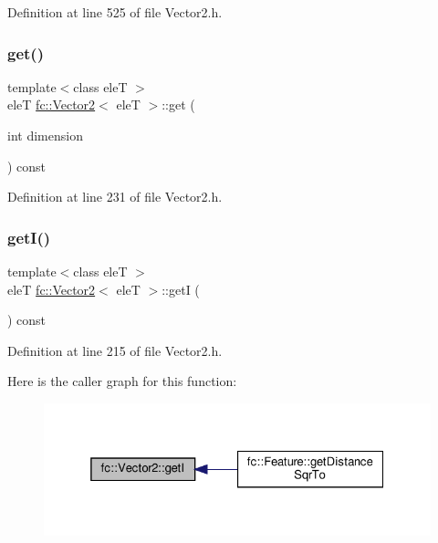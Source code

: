 Definition at line 525 of file Vector2.\+h.

\mbox{\label{classfc_1_1Vector2_acca96b9b6d26a214958f7e2d5fd63548}} 
\subsubsection{\texorpdfstring{get()}{get()}}
{\footnotesize\ttfamily template$<$class eleT $>$ \\
eleT \hyperlink{classfc_1_1Vector2}{fc\+::\+Vector2}$<$ eleT $>$\+::get (\begin{DoxyParamCaption}\item[{int}]{dimension }\end{DoxyParamCaption}) const}



Definition at line 231 of file Vector2.\+h.

\mbox{\label{classfc_1_1Vector2_a982222ce26bc27601de2ba42a3a48b80}} 
\subsubsection{\texorpdfstring{get\+I()}{getI()}}
{\footnotesize\ttfamily template$<$class eleT $>$ \\
eleT \hyperlink{classfc_1_1Vector2}{fc\+::\+Vector2}$<$ eleT $>$\+::getI (\begin{DoxyParamCaption}{ }\end{DoxyParamCaption}) const}



Definition at line 215 of file Vector2.\+h.

Here is the caller graph for this function\+:
\nopagebreak
\begin{figure}[H]
\begin{center}
\leavevmode
\includegraphics[width=325pt]{d9/d08/classfc_1_1Vector2_a982222ce26bc27601de2ba42a3a48b80_icgraph}
\end{center}
\end{figure}
\mbox{\label{classfc_1_1Vector2_a0befaabdafcb34ab8c3bc0063d0b94a3}} 
